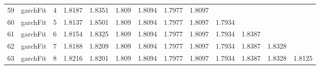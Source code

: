 \documentclass[10pt,a4paper]{article}
\begin{document}
\begin{table}[ht]
\begin{tabular}{rlrllllllllll}
  59 & garchFit &     4 & 1.8187 & 1.8351 & 1.809 & 1.8094 & 1.7977 & 1.8097 &  &  &  &  \\ 
  60 & garchFit &     5 & 1.8137 & 1.8501 & 1.809 & 1.8094 & 1.7977 & 1.8097 & 1.7934 &  &  &  \\ 
  61 & garchFit &     6 & 1.8154 & 1.8325 & 1.809 & 1.8094 & 1.7977 & 1.8097 & 1.7934 & 1.8387 &  &  \\ 
  62 & garchFit &     7 & 1.8188 & 1.8209 & 1.809 & 1.8094 & 1.7977 & 1.8097 & 1.7934 & 1.8387 & 1.8328 &  \\ 
  63 & garchFit &     8 & 1.8216 & 1.8201 & 1.809 & 1.8094 & 1.7977 & 1.8097 & 1.7934 & 1.8387 & 1.8328 & 1.8125 \\ 
   \hline
\end{tabular}
\end{table}
\end{document}
